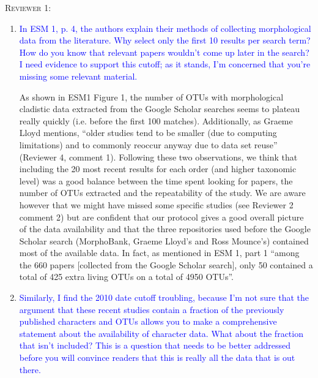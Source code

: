 \documentclass[12pt,letterpaper]{article}
\renewcommand{\section}[1]{%
\bigskip
\begin{center}
\begin{Large}
\normalfont\scshape #1
\medskip
\end{Large}
\end{center}}
\begin{document}
\section{Reviewer 1:}
\begin{enumerate}
\item{\textcolor{blue}{In ESM 1, p. 4, the authors explain their methods of collecting morphological data from the literature. Why select only the first 10 results per search term? How do you know that relevant papers wouldn't come up later in the search? I need evidence to support this cutoff; as it stands, I'm concerned that you're missing some relevant material.}}

As shown in ESM1 Figure 1, the number of OTUs with morphological cladistic data extracted from the Google Scholar searches seems to plateau really quickly (i.e. before the first 100 matches).
Additionally, as Graeme Lloyd mentions, ``older studies tend to be smaller (due to computing limitations) and to commonly reoccur anyway due to data set reuse'' (Reviewer 4, comment 1).
Following these two observations, we think that including the 20 most recent results for each order (and higher taxonomic level) was a good balance between the time spent looking for papers, the number of OTUs extracted and the repeatability of the study.
We are aware however that we might have missed some specific studies (see Reviewer 2 comment 2) but are confident that our protocol gives a good overall picture of the data availability and that the three repositories used before the Google Scholar search (MorphoBank, Graeme Lloyd's and Ross Mounce's) contained most of the available data.
In fact, as mentioned in ESM 1, part 1 ``among the 660 papers [collected from the Google Scholar search], only 50 contained a total of 425 extra living OTUs on a total of 4950 OTUs''.

\item{\textcolor{blue}{Similarly, I find the 2010 date cutoff troubling, because I'm not sure that the argument that these recent studies contain a fraction of the previously published characters and OTUs allows you to make a comprehensive statement about the availability of character data. What about the fraction that isn't included? This is a question that needs to be better addressed before you will convince readers that this is really all the data that is out there.}}


\end{enumerate}
\end{document}
